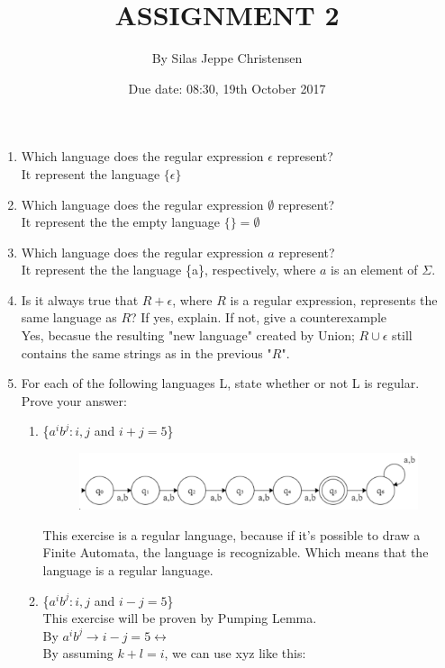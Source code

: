\documentclass{article}
\title{ASSIGNMENT 2}
\date{Due date: 08:30, 19th October 2017}
\author{By Silas Jeppe Christensen}
\begin{document}
	\maketitle
	\subparagraph{}
	\begin{enumerate}
		\item Which language does the regular expression $\epsilon$ represent?\\
		It represent the language $\{\epsilon\}$
		\item Which language does the regular expression $\emptyset$ represent?\\
		It represent the the empty language $\{\} = \emptyset$ 
		\item Which language does the regular expression $a$ represent?\\
		It represent the the language \{a\}, respectively, where $a$ is an element of $\Sigma$. 
		\item Is it always true that $R + \epsilon$, where $R$ is a regular expression, represents the same language as $R$? If yes, explain. If not, give a counterexample\\
		Yes, becasue the resulting "new language" created by Union; $R \cup \epsilon$ still contains the same strings as in the previous "$R$".\\
		\item  For each of the following languages L, state whether or not L is regular. Prove your answer: 
		\begin{enumerate}[label=(\alph*)]
			\item \{$a^{i}b^{j} : i,j$ and $i + j = 5$\}\\
			\begin{figure}[H]
				\centering
				\includegraphics[width=0.7\linewidth]{5a}
				\caption{}
				\label{fig:5a}
			\end{figure}
			This exercise is a regular language, because if it's possible to draw a Finite Automata, the language is recognizable. Which means that the language is a regular language.
			\item \{$a^{i}b^{j} : i,j$ and $i - j = 5$\}\\
			This exercise will be proven by Pumping Lemma.\\
			By $a^ib^j \rightarrow i-j = 5 \leftrightarrow$ \\
			By assuming $k + l = i$, we can use xyz like this:\\

\end{enumerate}
\end{enumerate}
\end{document}
